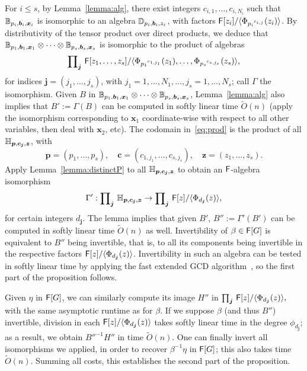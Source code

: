 For $i \le s$, by Lemma~\ref{lemma:alg}, there exist integers
$c_{i,1},\dots,c_{i,N_i}$ such that
$\mathbb{B}_{p_i,\boldsymbol{b}_i,\boldsymbol{x}_i}$ is isomorphic to an
algebra $\mathbb{D}_{p_i, \boldsymbol{b}_i, z_i}$, with factors 
${\mathsf{F}}[z_i]/\langle \Phi_{{p_i}^{c_{i,j}}}(z_i) \rangle$.
By distributivity of the tensor product over direct products, we
deduce that $\mathbb{B}_{p_1,\boldsymbol{b}_1,\boldsymbol{x}_1} \otimes \cdots
\otimes \mathbb{B}_{p_s,\boldsymbol{b}_s,\boldsymbol{x}_s}$ is isomorphic to
the product of algebras
 \begin{equation}\label{eq:prod}
\text{\small $\prod$}_{\boldsymbol{j}}~ {\mathsf{F}}[z_1,\dots,z_s]/
\langle \Phi_{{p_1}^{c_{1,j_1}}}(z_1),\dots, \Phi_{{p_s}^{c_{s,j_s}}}(z_s) \rangle,   
 \end{equation}
for indices $\boldsymbol{j}=(j_1,\dots,j_s)$, with
$j_1 =1,\dots,N_1,\dots,j_s=1,\dots,N_s$;
call $\Gamma$ the isomorphism. Given $B$ in $\mathbb{B}_{p_1,\boldsymbol{b}_1,\boldsymbol{x}_1} \otimes
\cdots \otimes \mathbb{B}_{p_s,\boldsymbol{b}_s,\boldsymbol{x}_s}$,
Lemma~\ref{lemma:alg} also implies that $B':=\Gamma(B)$ can be
computed in softly linear time $\tilde{O}(n)$ (apply the isomorphism
corresponding to $\boldsymbol{x}_1$ coordinate-wise with respect to
all other variables, then deal with $\boldsymbol{x}_2$, etc).
The codomain in~\eqref{eq:prod} is the product of all $\mathbb{H}_{\boldsymbol{p},\boldsymbol{c}_{\boldsymbol{j}},\boldsymbol{z}}$,
with 
$$\boldsymbol{p}=(p_1,\dots,p_s),\quad \boldsymbol{c}=(c_{1,j_1},\dots,c_{s,j_s}),\quad \boldsymbol{z}=(z_1,\dots,z_s).$$
Apply Lemma~\ref{lemma:distinctP} to all 
$\mathbb{H}_{\boldsymbol{p},\boldsymbol{c}_{\boldsymbol{j}},\boldsymbol{z}}$ to obtain
an ${\mathsf{F}}$-algebra isomorphism
$$\Gamma': \text{\small $\prod$}_{\boldsymbol{j}}~
\mathbb{H}_{\boldsymbol{p},\boldsymbol{c}_{\boldsymbol{j}},\boldsymbol{z}} \to
\text{\small $\prod$}_{\boldsymbol{j}} ~{\mathsf{F}}[z]/\langle
\Phi_{d_{\boldsymbol{j}}}(z) \rangle,$$ for certain integers
$d_{\boldsymbol{j}}$. The lemma implies that given $B'$,
$B'':=\Gamma'(B')$ can be computed in softly linear time
$\tilde{O}(n)$ as well. Invertibility of $\beta \in {\mathsf{F}}[G]$ is
equivalent to $B''$ being invertible, that is, to all its components
being invertible in the respective factors ${\mathsf{F}}[z]/\langle
\Phi_{d_{\boldsymbol{j}}}(z) \rangle$. Invertibility in such an
algebra can be tested in softly linear time by applying the fast
extended GCD algorithm~\citep[Chapter~11]{vzGathen13}, so the first
part of the proposition follows.

Given $\eta$ in ${\mathsf{F}}[G]$, we can similarly compute its image $H''$ in
$\text{\small $\prod$}_{\boldsymbol{j}} ~{\mathsf{F}}[z]/\langle
\Phi_{d_{\boldsymbol{j}}}(z) \rangle,$ with the same asymptotic
runtime as for $\beta$. If we suppose $\beta$ (and thus $B''$)
invertible, division in each ${\mathsf{F}}[z]/\langle
\Phi_{d_{\boldsymbol{j}}}(z) \rangle$ takes softly linear time in the
degree $\phi_{d_{\boldsymbol{j}}}$; as a result, we obtain ${B''}^{-1}
H''$ in time $\tilde{O}(n)$.  One can finally invert all
isomorphisms we applied, in order to recover $\beta^{-1} \eta$ in
${\mathsf{F}}[G]$; this also takes time $\tilde{O}(n)$. Summing all costs,
this establishes the second part of the proposition.


